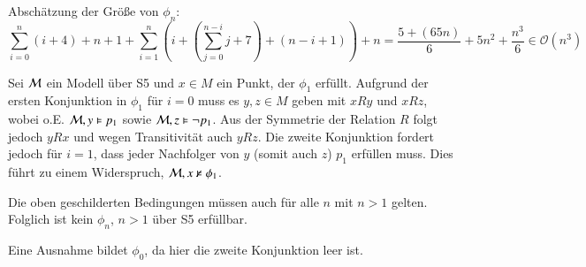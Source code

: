 Abschätzung der Größe von $\phi_n$:
\[
\sum_{i=0}^{n}(i + 4) + n + 1 + \sum_{i=1}^{n}\left(i + \left(\sum_{j=0}^{n-i}
j + 7\right) + (n - i + 1) \right) + n = \frac{5+(65 n)}{6}+5 n^2+\frac{n^3}{6}
\in \mathcal{O}(n^3)
\]

Sei $\mathcal{M}$ ein Modell über S5 und $x \in M$ ein Punkt, der $\phi_1$ erfüllt. Aufgrund der ersten Konjunktion in
$\phi_1$ für $i = 0$ muss es $y, z \in M$ geben mit $xRy$ und $xRz$, wobei o.E. $\mathcal{M}, y \vDash p_1$ sowie
$\mathcal{M}, z \vDash \neg p_1$. Aus der Symmetrie der Relation $R$ folgt jedoch $yRx$ und wegen Transitivität auch
$yRz$. Die zweite Konjunktion fordert jedoch für $i = 1$, dass jeder Nachfolger von $y$ (somit auch $z$) $p_1$ erfüllen
muss. Dies führt zu einem Widerspruch, $\mathcal{M}, x \not\vDash \phi_1$.

Die oben geschilderten Bedingungen müssen auch für alle $n$ mit $n > 1$ gelten. Folglich ist kein $\phi_n$, $n > 1$ über
S5 erfüllbar.

Eine Ausnahme bildet $\phi_0$, da hier die zweite Konjunktion leer ist.


